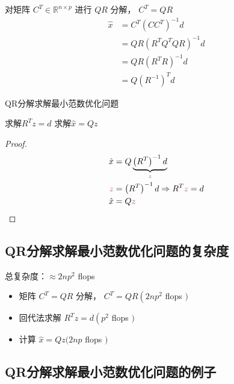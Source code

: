 对矩阵 $ C^{T} \in \mathbb{R}^{n \times p} $ 进行 $ Q R $ 分解， $ C^{T}=Q R $
$$
\begin{aligned}
\hat{x} &=C^{T}\left(C C^{T}\right)^{-1} d \\
&=Q R\left(R^{T} Q^{T} Q R\right)^{-1} d \\
&=Q R\left(R^{T} R\right)^{-1} d \\
&=Q \left(R^{-1}\right)^T d
\end{aligned}
$$

\begin{algorithm}[htbp]
    \caption{QR分解求解最小范数优化问题}
    求解$R^T z=d$ \;
    求解$\hat{x} = Qz$\;
    
\end{algorithm}

\begin{proof}
    $$\displaystyle \begin{aligned}
    \hat{x} & =Q\underbrace{\left( R^{T}\right)^{-1} d}_{\textcolor[rgb]{0.72,0.33,0.31}{z}}\\
    \textcolor[rgb]{0.72,0.33,0.31}{z} & =\left( R^{T}\right)^{-1} d\Rightarrow R^{T}\textcolor[rgb]{0.72,0.33,0.31}{z} =d\\
    \hat{x} & =Q\textcolor[rgb]{0.72,0.33,0.31}{z}
    \end{aligned}$$
\end{proof}


\subsection{QR分解求解最小范数优化问题的复杂度}

总复杂度：$ \approx 2 n p^{2} $ flops

\begin{itemize}
    \item 矩阵 $ C^{T}=Q R $ 分解， $ C^{T}=Q R\left(2 n p^{2}\right. $ flops $ ) $
    \item 回代法求解 $ R^{T} z=d\left(p^{2}\right. $ flops $ ) $
    \item 计算 $ \hat{x}=Q z(2 n p $ flops $ ) $
\end{itemize}



\subsection{QR分解求解最小范数优化问题的例子}

